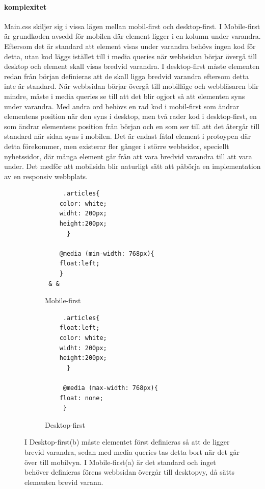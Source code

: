 \documentclass[11pt]{article}
\begin{document}
\paragraph{komplexitet}\mbox{}

Main.css skiljer sig i vissa lägen mellan mobil-first och desktop-first. I Mobile-first är grundkoden avsedd för mobilen där element ligger i en kolumn under varandra. Eftersom det är standard att element visas under varandra behövs ingen kod för detta, utan kod läggs istället till i media queries när webbsidan börjar övergå till desktop och element skall visas bredvid varandra. I desktop-first måste elementen redan från början definieras att de skall ligga bredvid varandra eftersom detta inte är standard. När webbsidan börjar övergå till mobilläge och webbläsaren blir mindre, måste i media queries se till att det blir ogjort så att elementen syns under varandra. Med andra ord behövs en rad kod i mobil-first som ändrar elementens position när den syns i desktop, men två rader kod i desktop-first, en som ändrar elementens position från början och en som ser till att det återgår till standard när sidan syns i mobilen. Det är endast fåtal element i protoypen där detta förekommer, men existerar fler gånger i större webbsidor, speciellt nyhetssidor, där många element går från att vara bredvid varandra till att vara under. Det medför att mobilsida blir naturligt sätt att påbörja en implementation av en responsiv webbplats. 

\setcounter{figure}{12}
\begin{figure}[H]
  \begin{subfigure}[b]{.5\linewidth }

    \begin{lstlisting}
     .articles{
	color: white;
	widht: 200px;
	height:200px;
      }

    @media (min-width: 768px){
	float:left;
    }
 & &
    \end{lstlisting}
    \caption{Mobile-first}
  \end{subfigure}
  \begin{subfigure}[b]{.5\linewidth}
	\begin{lstlisting}
     .articles{
	float:left;
	color: white;
	widht: 200px;
	height:200px;
      }

     @media (max-width: 768px){
	float: none;  
     }
	\end{lstlisting}
    \caption{Desktop-first}
  \end{subfigure}
  \caption{I Desktop-first(b) måste elementet först definieras så att de ligger brevid varandra, sedan med media queries tas detta bort när det går över till mobilvyn. I Mobile-first(a) är det standard och inget behöver definieras förens webbsidan övergår till desktopvy, då sätts elementen brevid varann.}
\end{figure}
\end{document}
